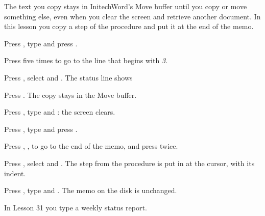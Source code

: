 The text you copy stays in InitechWord's Move buffer until you copy or move
something else, even when you clear the screen and retrieve another
document.  In this lesson you copy a step of the procedure and put it at the
end of the memo.

\begin{WPSteps}
\item Press , type  and press
.
\item Press  five times to go to the line that begins with
\textit{3.}
\item Press , select  and
.  The status line shows 
\item Press .  The copy stays in the Move buffer.
\item Press , type  and : the screen
clears.
\end{WPSteps}

\begin{WPSteps}
\item Press , type  and press
.
\item Press , ,  to go to the end
of the memo, and press  twice.
\item Press , select  and
.  The step from the procedure is put in at the cursor,
with its indent.
\end{WPSteps}

\begin{WPSteps}
\item Press , type  and .  The memo
on the disk is unchanged.
\end{WPSteps}
\EndReplay
In Lesson 31 you type a weekly status report.
